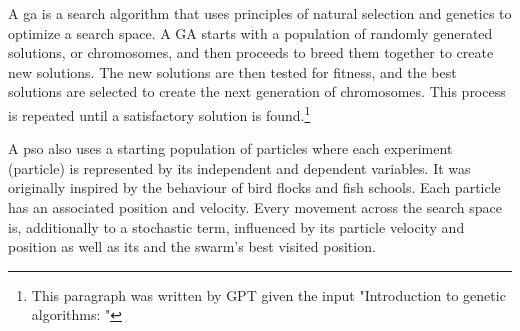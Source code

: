 A \gls{ga} is a search algorithm that uses principles of natural selection and genetics to optimize a search space. A GA starts with a population of randomly generated solutions, or chromosomes, and then proceeds to breed them together to create new solutions. The new solutions are then tested for fitness, and the best solutions are selected to create the next generation of chromosomes. This process is repeated until a satisfactory solution is found.\footnote{This paragraph was written by GPT\cite{Liu2021gpt} given the input "Introduction to genetic algorithms: "}

\iffalse
\Gls{ga} uses a starting population of size $p$ ($p \in$ \td{N$^+$}) where each experiment (or data point) 
is represented by a fixed size genome of 0's and 1's in most cases. 
Each individual is then given a fitness value. 
New genomes are added and discarded from the population using 
selection, mutation and crossover operations.
\fi

A \gls{pso} also uses a starting population of particles where each experiment (particle) 
is represented by its independent and dependent variables. 
It was originally inspired by the behaviour of bird flocks and fish schools\cite{villanova2010function,Kennedy1995}.
Each particle has an associated position and velocity. 
Every movement across the search space is, 
additionally to a stochastic term, 
influenced by its particle velocity and position as well as its and the swarm's best visited position.


